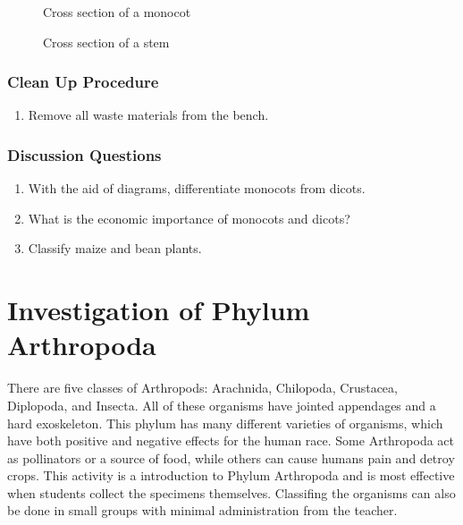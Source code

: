 \begin{figure}[h]
\begin{center}
\def\svgwidth{6cm}

\caption{Cross section of a monocot}
\label{fig:monoroot}
\end{center}
\end{figure}

\begin{figure}[h]
\begin{center}
\def\svgwidth{6cm}

\caption{Cross section of a stem}
\label{fig:monostem}
\end{center}
\end{figure}

\subsubsection*{Clean Up Procedure}
\begin{enumerate}
\item{Remove all waste materials from the bench.}
\end{enumerate}

\subsubsection*{Discussion Questions}
\begin{enumerate}
\item{With the aid of diagrams, differentiate monocots from dicots.}
\item{What is the economic importance of monocots and dicots?}
\item{Classify maize and bean plants.}
\end{enumerate}


\section{Investigation of Phylum Arthropoda}
There are five classes of Arthropods: Arachnida, Chilopoda, Crustacea, Diplopoda, and Insecta. All of these organisms have jointed appendages and a hard exoskeleton. This phylum has many different varieties of organisms, which have both positive and negative effects for the human race.  Some Arthropoda act as pollinators or a source of food, while others can cause humans pain and detroy crops.
This activity is a introduction to Phylum Arthropoda and is most effective when students collect the specimens themselves.  Classifing the organisms can also be done in small groups with minimal administration from the teacher.

